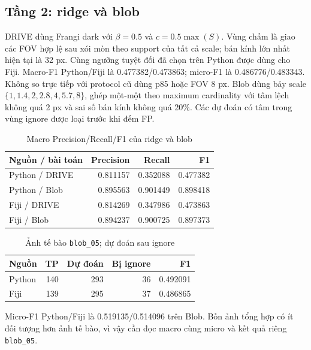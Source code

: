 \documentclass[conference]{IEEEtran}
\begin{document}
\subsection{Tầng 2: ridge và blob}
DRIVE dùng Frangi dark với $\beta=0.5$ và $c=0.5\max(S)$. Vùng chấm là giao các FOV hợp lệ sau xói mòn theo support của tất cả scale; bán kính lớn nhất hiện tại là 32 px. Cùng ngưỡng tuyệt đối đã chọn trên Python được dùng cho Fiji. Macro-F1 Python/Fiji là 0.477382/0.473863; micro-F1 là 0.486776/0.483343. Không so trực tiếp với protocol cũ dùng p85 hoặc FOV 8 px.
Blob dùng bảy scale $\{1,1.4,2,2.8,4,5.7,8\}$, ghép một-một theo maximum cardinality với tâm lệch không quá 2 px và sai số bán kính không quá 20\%. Các dự đoán có tâm trong vùng ignore được loại trước khi đếm FP.
\begin{table}[htbp]\centering\small
\caption{Macro Precision/Recall/F1 của ridge và blob}\label{tab:duc10_accuracy}
\begin{tabular}{lrrr}\toprule
Nguồn / bài toán & Precision & Recall & F1 \\\midrule
Python / DRIVE & 0.811157 & 0.352088 & 0.477382 \\
Python / Blob & 0.895563 & 0.901449 & 0.898418 \\
Fiji / DRIVE & 0.814269 & 0.347986 & 0.473863 \\
Fiji / Blob & 0.894237 & 0.900725 & 0.897373 \\
\bottomrule\end{tabular}\end{table}
\begin{table}[htbp]\centering
\caption{Ảnh tế bào \texttt{blob\_05}; dự đoán sau ignore}\label{tab:duc10_cells}
\begin{tabular}{lrrrr}\toprule
Nguồn & TP & Dự đoán & Bị ignore & F1 \\\midrule
Python & 140 & 293 & 36 & 0.492091 \\
Fiji & 139 & 295 & 37 & 0.486865 \\
\bottomrule\end{tabular}\end{table}
Micro-F1 Python/Fiji là 0.519135/0.514096 trên Blob. Bốn ảnh tổng hợp có ít đối tượng hơn ảnh tế bào, vì vậy cần đọc macro cùng micro và kết quả riêng \texttt{blob\_05}.
\end{document}
